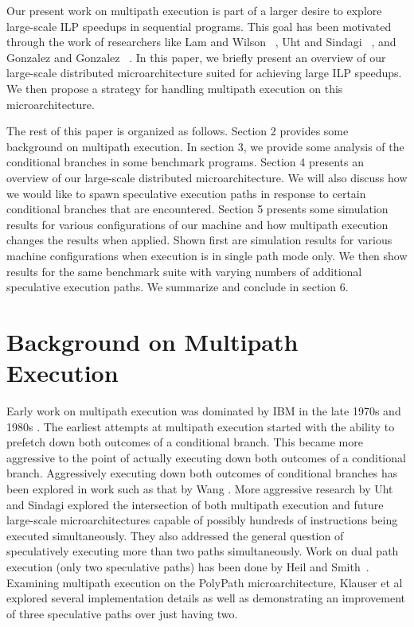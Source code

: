 \documentclass[10pt,dvips]{article}
\begin{document}
Our present work on multipath execution is part of a larger
desire to explore large-scale ILP speedups in sequential programs.
This goal has been motivated through the work of researchers like
Lam and Wilson ~\cite{Lam92},
Uht and Sindagi ~\cite{Uht95},
and Gonzalez and Gonzalez ~\cite{Gon97}.
In this paper, we briefly present an overview of our large-scale distributed
microarchitecture suited for achieving large ILP speedups.  
We then propose a strategy for handling
multipath execution on this microarchitecture.

The rest of this paper is organized as follows.
Section 2 provides some background on multipath execution.
In section 3, we provide some analysis of the conditional
branches in some benchmark programs.  
Section 4 presents an overview of our large-scale distributed
microarchitecture.
We will also discuss how we
would like to 
spawn speculative execution paths
in response to certain conditional branches that 
are encountered.
Section 5 presents some simulation results for various
configurations of our machine and how multipath execution
changes the results when applied.  Shown first are simulation
results for various machine configurations when execution is in
single path mode only.  We then show results for
the same benchmark suite with varying numbers of additional
speculative execution paths.
We summarize and conclude in section 6.
%
\section{Background on Multipath Execution}
%
Early work on multipath execution was
dominated by IBM in the
late 1970s and 1980s \cite{Conners79}.
The earliest attempts at multipath
execution started with the ability to prefetch down both
outcomes of a conditional branch.  This became more aggressive
to the point of actually executing down both outcomes of
a conditional branch.  Aggressively executing down both outcomes
of conditional branches has been explored in work such as that by
Wang \cite{Wang90}.  
More aggressive research by Uht and
Sindagi \cite{Uht95} explored the intersection of both
multipath execution and future large-scale microarchitectures
capable of possibly hundreds of instructions being executed simultaneously.
They also addressed the general question of speculatively executing
more than two paths simultaneously.
Work on dual path execution (only two speculative paths) has
been done by Heil and Smith~\cite{Heil96}.
Examining multipath execution on the PolyPath microarchitecture,
Klauser et al explored several implementation details
as well as demonstrating an improvement of three speculative paths
over just having two.
\end{document}
